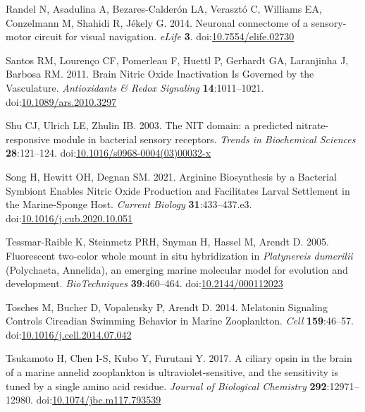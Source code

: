 \documentclass[
  10pt,
  onecolumn]{article}
\newlength{\cslhangindent}
\newlength{\cslentryspacingunit} %
\newenvironment{CSLReferences}[2] %
 {%
  \setlength{\parindent}{0pt}
  \ifodd #1
  \let\oldpar\par
  \def\par{\hangindent=\cslhangindent\oldpar}
  \fi
  \setlength{\parskip}{#2\cslentryspacingunit}
 }%
 {}
\begin{document}
\begin{CSLReferences}{1}{0}
\leavevmode{}%
Randel N, Asadulina A, Bezares-Calderón LA, Verasztó C, Williams EA,
Conzelmann M, Shahidi R, Jékely G. 2014. Neuronal connectome of a
sensory-motor circuit for visual navigation. \emph{eLife} \textbf{3}.
doi:\href{https://doi.org/10.7554/elife.02730}{10.7554/elife.02730}

\leavevmode{}%
Santos RM, Lourenço CF, Pomerleau F, Huettl P, Gerhardt GA, Laranjinha
J, Barbosa RM. 2011. Brain Nitric Oxide Inactivation Is Governed by the
Vasculature. \emph{Antioxidants \& Redox Signaling}
\textbf{14}:1011--1021.
doi:\href{https://doi.org/10.1089/ars.2010.3297}{10.1089/ars.2010.3297}

\leavevmode{}%
Shu CJ, Ulrich LE, Zhulin IB. 2003. The NIT domain: a predicted
nitrate-responsive module in bacterial sensory receptors. \emph{Trends
in Biochemical Sciences} \textbf{28}:121--124.
doi:\href{https://doi.org/10.1016/s0968-0004(03)00032-x}{10.1016/s0968-0004(03)00032-x}

\leavevmode{}%
Song H, Hewitt OH, Degnan SM. 2021. Arginine Biosynthesis by a Bacterial
Symbiont Enables Nitric Oxide Production and Facilitates Larval
Settlement in the Marine-Sponge Host. \emph{Current Biology}
\textbf{31}:433--437.e3.
doi:\href{https://doi.org/10.1016/j.cub.2020.10.051}{10.1016/j.cub.2020.10.051}

\leavevmode{}%
Tessmar-Raible K, Steinmetz PRH, Snyman H, Hassel M, Arendt D. 2005.
Fluorescent two-color whole mount in situ hybridization in
{\emph{Platynereis dumerilii}} (Polychaeta, Annelida), an emerging
marine molecular model for evolution and development.
\emph{BioTechniques} \textbf{39}:460--464.
doi:\href{https://doi.org/10.2144/000112023}{10.2144/000112023}

\leavevmode{}%
Tosches M, Bucher D, Vopalensky P, Arendt D. 2014. Melatonin Signaling
Controls Circadian Swimming Behavior in Marine Zooplankton. \emph{Cell}
\textbf{159}:46--57.
doi:\href{https://doi.org/10.1016/j.cell.2014.07.042}{10.1016/j.cell.2014.07.042}

\leavevmode{}%
Tsukamoto H, Chen I-S, Kubo Y, Furutani Y. 2017. A ciliary opsin in the
brain of a marine annelid zooplankton is ultraviolet-sensitive, and the
sensitivity is tuned by a single amino acid residue. \emph{Journal of
Biological Chemistry} \textbf{292}:12971--12980.
doi:\href{https://doi.org/10.1074/jbc.m117.793539}{10.1074/jbc.m117.793539}


\end{CSLReferences}
\end{document}

